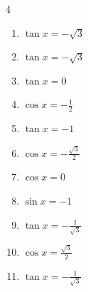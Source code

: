 \begin{multicols}{4}
\begin{enumerate}
  \item $\displaystyle \tan{x}  = -\sqrt{3}$


  \item $\displaystyle \tan{x}  = -\sqrt{3}$


  \item $\displaystyle \tan{x}  = 0$


  \item $\displaystyle \cos{x}  = -\frac{1}{2}$


  \item $\displaystyle \tan{x}  = -1$


  \item $\displaystyle \cos{x}  = -\frac{\sqrt{3}}{2}$


\columnbreak %

\resetques

  \item $\displaystyle \cos{x}  = 0$


  \item $\displaystyle \sin{x}  = -1$


  \item $\displaystyle \tan{x}  = -\frac{1}{\sqrt{3}}$


  \item $\displaystyle \cos{x}  = \frac{\sqrt{3}}{2}$


  \item $\displaystyle \tan{x}  = -\frac{1}{\sqrt{3}}$



\end{enumerate}
\end{multicols}
